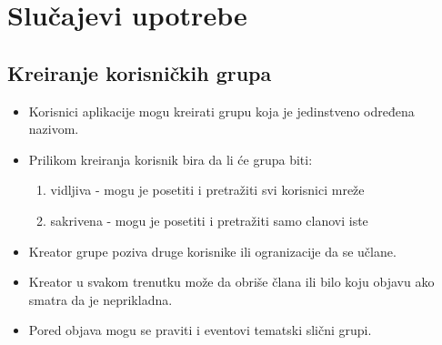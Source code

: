 \section{Slučajevi upotrebe}
\subsection{Kreiranje korisničkih grupa}
\begin{itemize}
\item Korisnici aplikacije mogu kreirati grupu koja je jedinstveno određena nazivom. 
\item Prilikom kreiranja korisnik bira da li će grupa biti:

\begin{enumerate}
\item vidljiva - mogu je posetiti i pretražiti svi korisnici mreže
\item sakrivena - mogu je posetiti i pretražiti samo clanovi iste
\end{enumerate}

\item	Kreator grupe poziva druge korisnike ili ogranizacije da se učlane.
\item	Kreator u svakom trenutku može da obriše člana ili bilo koju objavu ako smatra da je neprikladna.
\item	Pored objava mogu se praviti i eventovi tematski slični grupi.
\end{itemize}
